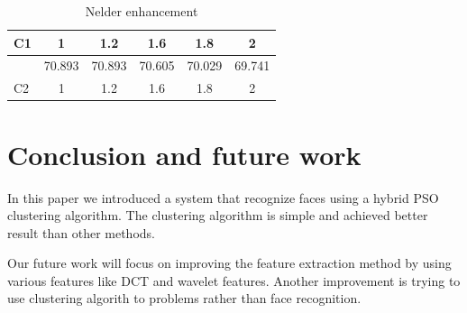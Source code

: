 \documentclass[a4paper,twoside]{article}
\begin{document}
\begin{table}
	\centering
		\caption{ Nelder enhancement  }
	\label{tab:nelder}
		\begin{tabular}{|l|c|c|c|c|c|}
		 \hline
C1 &	1	&1.2&	1.6&	1.8 &	2	\\ \hline
	&70.893	&70.893	&70.605	&70.029	&69.741 \\  \hline
C2	&	1	&1.2&	1.6&	1.8 &	2	\\ \hline

\end{tabular}
		 
\end{table}

\section{Conclusion and future work}
\label{sec:Conclusion}
In this paper we introduced a system that recognize faces using a hybrid PSO clustering algorithm. The clustering algorithm is simple and achieved better result than other methods.


Our future work will focus on improving the feature extraction method by using various features like DCT and wavelet features. Another improvement is trying to use clustering algorith to problems rather than face recognition. 


%
%
%

%

\end{document}
